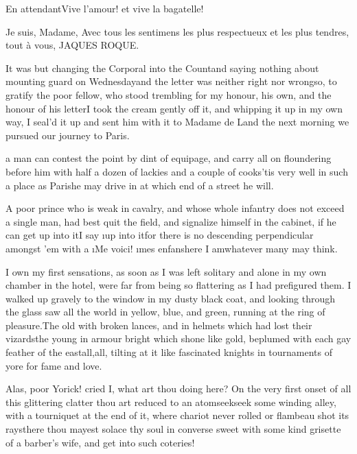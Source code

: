 \documentclass[twoside]{article}
\begin{document}
En attendant\tsk Vive l’amour! et vive la bagatelle!

                                                          Je suis, Madame,
                                          Avec tous les sentimens les plus
                                          respectueux et les plus tendres,
                                                              tout à vous,
                                                             JAQUES ROQUE.

It was but changing the Corporal into the Count\tsk and saying nothing about
mounting guard on Wednesday\tsk and the letter was neither right nor
wrong\tsk so, to gratify the poor fellow, who stood trembling for my honour,
his own, and the honour of his letter\tsk I took the cream gently off it,
and whipping it up in my own way, I seal’d it up and sent him with it to
Madame de L\tsk \tsk and the next morning we pursued our journey to Paris.






 a man can contest the point by dint of equipage, and carry all on
floundering before him with half a dozen of lackies and a couple of
cooks\tsk ’tis very well in such a place as Paris\tsk he may drive in at which
end of a street he will.

A poor prince who is weak in cavalry, and whose whole infantry does not
exceed a single man, had best quit the field, and signalize himself in
the cabinet, if he can get up into it\tsk I say \i{up into it}\tsk for there is no
descending perpendicular amongst ’em with a \lqq \i{Me voici}! \i{mes
enfans}\rqq\tsk here I am\tsk whatever many may think.

I own my first sensations, as soon as I was left solitary and alone in my
own chamber in the hotel, were far from being so flattering as I had
prefigured them.  I walked up gravely to the window in my dusty black
coat, and looking through the glass saw all the world in yellow, blue,
and green, running at the ring of pleasure.\tsk The old with broken lances,
and in helmets which had lost their vizards\tsk the young in armour bright
which shone like gold, beplumed with each gay feather of the
east\tsk all,\tsk all, tilting at it like fascinated knights in tournaments of
yore for fame and love.\tsk 

Alas, poor Yorick! cried I, what art thou doing here?  On the very first
onset of all this glittering clatter thou art reduced to an
atom\tsk seek\tsk seek some winding alley, with a tourniquet at the end of it,
where chariot never rolled or flambeau shot its rays\tsk there thou mayest
solace thy soul in converse sweet with some kind grisette of a barber’s
wife, and get into such coteries!\tsk 
\end{document}
